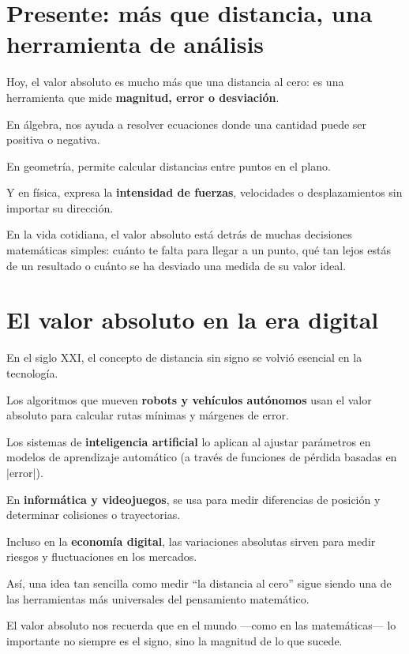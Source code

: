 \section*{Presente: más que distancia, una herramienta de análisis}

\begin{reseñaplana}
Hoy, el valor absoluto es mucho más que una distancia al cero: es una herramienta que mide \textbf{magnitud, error o desviación}.  

En álgebra, nos ayuda a resolver ecuaciones donde una cantidad puede ser positiva o negativa.  

En geometría, permite calcular distancias entre puntos en el plano.  

Y en física, expresa la \textbf{intensidad de fuerzas}, velocidades o desplazamientos sin importar su dirección.  

En la vida cotidiana, el valor absoluto está detrás de muchas decisiones matemáticas simples: cuánto 
te falta para llegar a un punto, qué tan lejos estás de un resultado o cuánto se ha desviado una medida de su valor ideal.  
\end{reseñaplana}

\section*{El valor absoluto en la era digital}  
En el siglo XXI, el concepto de distancia sin signo se volvió esencial en la tecnología.  

\begin{reseñaplana}
Los algoritmos que mueven \textbf{robots y vehículos autónomos} usan el valor absoluto para calcular 
rutas mínimas y márgenes de error.  

Los sistemas de \textbf{inteligencia artificial} lo aplican al ajustar parámetros en modelos de aprendizaje 
automático (a través de funciones de pérdida basadas en |error|).  

En \textbf{informática y videojuegos}, se usa para medir diferencias de posición y determinar colisiones o trayectorias.  

Incluso en la \textbf{economía digital}, las variaciones absolutas sirven para medir riesgos y fluctuaciones en los mercados.  

Así, una idea tan sencilla como medir “la distancia al cero” sigue siendo una de las herramientas más 
universales del pensamiento matemático.  

El valor absoluto nos recuerda que en el mundo —como en las matemáticas— lo importante no siempre es 
el signo, sino la magnitud de lo que sucede.
\end{reseñaplana}


